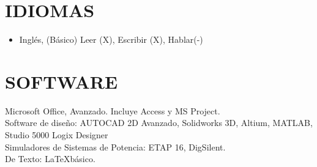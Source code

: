 \documentclass[margin]{res}
\begin{document}
\begin{resume}
\hfill
\section{IDIOMAS}

\begin{itemize}
  \item Inglés,  (Básico) \hfill Leer (X), Escribir (X), Hablar(-)

\end{itemize}

\section{SOFTWARE}
Microsoft Office, Avanzado. Incluye Access y MS Project.\\
Software de diseño: AUTOCAD 2D Avanzado, Solidworks 3D, Altium, MATLAB, Studio 5000 Logix Designer\\
Simuladores de Sistemas de Potencia: ETAP 16, DigSilent.\\
De Texto: \LaTeX básico.






\end{resume}
\end{document}
